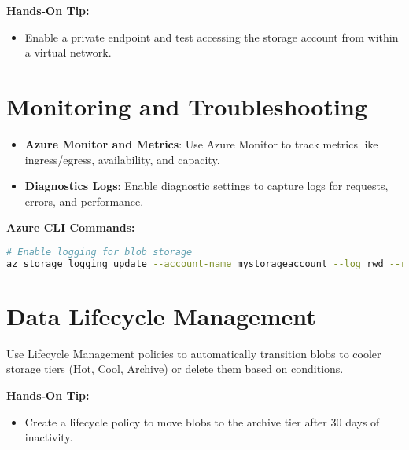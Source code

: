 \documentclass{article}
\begin{document}
\textbf{Hands-On Tip:}
\begin{itemize}
    \item Enable a private endpoint and test accessing the storage account from within a virtual network.
\end{itemize}

\section{Monitoring and Troubleshooting}
\begin{itemize}
    \item \textbf{Azure Monitor and Metrics}: Use Azure Monitor to track metrics like ingress/egress, availability, and capacity.
    \item \textbf{Diagnostics Logs}: Enable diagnostic settings to capture logs for requests, errors, and performance.
\end{itemize}

\textbf{Azure CLI Commands:}
\begin{lstlisting}[language=bash]
# Enable logging for blob storage
az storage logging update --account-name mystorageaccount --log rwd --retention 7 --services b
\end{lstlisting}

\section{Data Lifecycle Management}
Use Lifecycle Management policies to automatically transition blobs to cooler storage tiers (Hot, Cool, Archive) or delete them based on conditions.

\textbf{Hands-On Tip:}
\begin{itemize}
    \item Create a lifecycle policy to move blobs to the archive tier after 30 days of inactivity.
\end{itemize}
\end{document}
